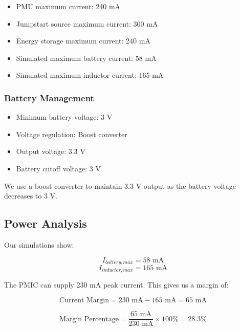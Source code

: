 \documentclass[a4paper,11pt]{article}%
\begin{document}
\begin{itemize}
    \item PMU maximum current: 240 mA
    \item Jumpstart source maximum current: 300 mA
    \item Energy storage maximum current: 240 mA
    \item Simulated maximum battery current: 58 mA
    \item Simulated maximum inductor current: 165 mA
\end{itemize}

\subsubsection{Battery Management}

\begin{itemize}
    \item Minimum battery voltage: 3 V
    \item Voltage regulation: Boost converter
    \item Output voltage: 3.3 V
    \item Battery cutoff voltage: 3 V
\end{itemize}

We use a boost converter to maintain 3.3 V output as the battery voltage decreases to 3 V.

\subsection{Power Analysis}

Our simulations show:

\begin{equation}
    I_{battery,max} = 58 \text{ mA}
\end{equation}
\begin{equation}
    I_{inductor,max} = 165 \text{ mA}
\end{equation}

The PMIC can supply 230 mA peak current. This gives us a margin of:

\begin{equation}
    \text{Current Margin} = 230 \text{ mA} - 165 \text{ mA} = 65 \text{ mA}
\end{equation}

\begin{equation}
    \text{Margin Percentage} = \frac{65 \text{ mA}}{230 \text{ mA}} \times 100\% = 28.3\%
\end{equation}
\end{document}
